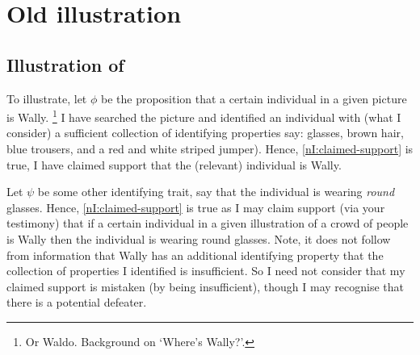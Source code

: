 \section{Old illustration}
\label{sec:old-illustration}

\subsection{Illustration of \nI{}}
\label{sec:illustration-ni}

\begin{note}[Illustration]
  To illustrate, let \(\phi\) be the proposition that a certain individual in a given picture is Wally.\nolinebreak
  \footnote{
    Or Waldo.
    Background on `Where's Wally?'.
  }
  I have searched the picture and identified an individual with (what I consider) a sufficient collection of identifying properties say: glasses, brown hair, blue trousers, and a red and white striped jumper).
  Hence, \ref{nI:claimed-support} is true, I have claimed support that the (relevant) individual is Wally.

  Let \(\psi\) be some other identifying trait, say that the individual is wearing \emph{round} glasses.
  Hence, \ref{nI:claimed-support} is true as I may claim support (via your testimony) that if a certain individual in a given illustration of a crowd of people is Wally then the individual is wearing round glasses.
  Note, it does not follow from information that Wally has an additional identifying property that the collection of properties I identified is insufficient.
  So I need not consider that my claimed support is mistaken (by being insufficient), though I may recognise that there is a potential defeater.


\end{note}
